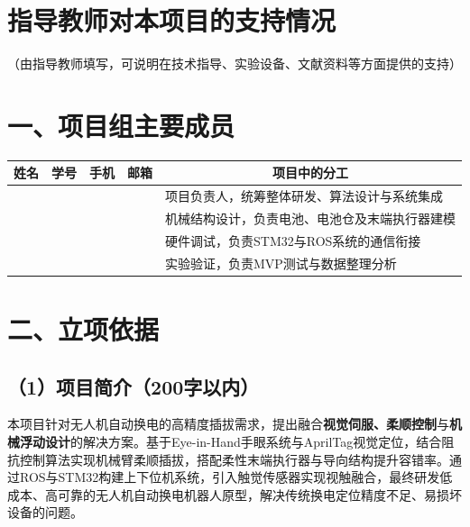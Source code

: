\documentclass[a4paper,12pt]{ctexart}
\begin{document}
\section*{指导教师对本项目的支持情况}
\noindent （由指导教师填写，可说明在技术指导、实验设备、文献资料等方面提供的支持）
\vspace{2cm} %

\section*{一、项目组主要成员}
\begin{table}[h!]
    \centering
    \begin{tabularx}{\textwidth}{|c|c|c|c|X|}
        \hline
        \textbf{姓名} & \textbf{学号} & \textbf{手机} & \textbf{邮箱} & \multicolumn{1}{c|}{\textbf{项目中的分工}} \\
        \hline
         &  &  &  & 项目负责人，统筹整体研发、算法设计与系统集成 \\
        \hline
         &  &  &  & 机械结构设计，负责电池、电池仓及末端执行器建模 \\
        \hline
         &  &  &  & 硬件调试，负责STM32与ROS系统的通信衔接 \\
        \hline
         &  &  &  & 实验验证，负责MVP测试与数据整理分析 \\
        \hline
    \end{tabularx}
\end{table}

\clearpage

\section*{二、立项依据}

\subsection*{（1）项目简介（200字以内）}
本项目针对无人机自动换电的高精度插拔需求，提出融合\textbf{视觉伺服、柔顺控制}与\textbf{机械浮动设计}的解决方案。基于Eye-in-Hand手眼系统与AprilTag视觉定位，结合阻抗控制算法实现机械臂柔顺插拔，搭配柔性末端执行器与导向结构提升容错率。通过ROS与STM32构建上下位机系统，引入触觉传感器实现视触融合，最终研发低成本、高可靠的无人机自动换电机器人原型，解决传统换电定位精度不足、易损坏设备的问题。
\end{document}
